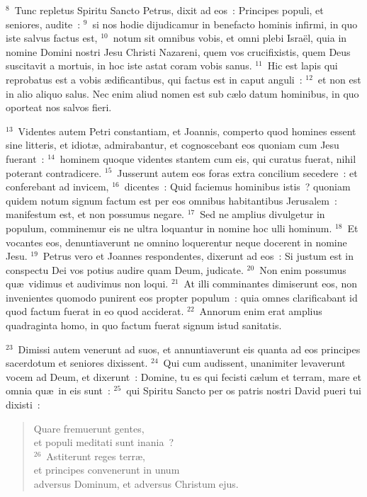${}^{8}$~Tunc repletus Spiritu Sancto Petrus, dixit ad eos~: Principes populi, et seniores, audite~:
${}^{9}$~si nos hodie dijudicamur in benefacto hominis infirmi, in quo iste salvus factus est,
${}^{10}$~notum sit omnibus vobis, et omni plebi Isra\"el, quia in nomine Domini nostri Jesu Christi Nazareni, quem vos crucifixistis, quem Deus suscitavit a mortuis, in hoc iste astat coram vobis sanus.
${}^{11}$~Hic est lapis qui reprobatus est a vobis \ae dificantibus, qui factus est in caput anguli~:
${}^{12}$~et non est in alio aliquo salus. Nec enim aliud nomen est sub c\ae lo datum hominibus, in quo oporteat nos salvos fieri.


${}^{13}$~Videntes autem Petri constantiam, et Joannis, comperto quod homines essent sine litteris, et idiot\ae , admirabantur, et cognoscebant eos quoniam cum Jesu fuerant~:
${}^{14}$~hominem quoque videntes stantem cum eis, qui curatus fuerat, nihil poterant contradicere.
${}^{15}$~Jusserunt autem eos foras extra concilium secedere~: et conferebant ad invicem,
${}^{16}$~dicentes~: Quid faciemus hominibus istis~? quoniam quidem notum signum factum est per eos omnibus habitantibus Jerusalem~: manifestum est, et non possumus negare.
${}^{17}$~Sed ne amplius divulgetur in populum, comminemur eis ne ultra loquantur in nomine hoc ulli hominum.
${}^{18}$~Et vocantes eos, denuntiaverunt ne omnino loquerentur neque docerent in nomine Jesu.
${}^{19}$~Petrus vero et Joannes respondentes, dixerunt ad eos~: Si justum est in conspectu Dei vos potius audire quam Deum, judicate.
${}^{20}$~Non enim possumus qu\ae\ vidimus et audivimus non loqui.
${}^{21}$~At illi comminantes dimiserunt eos, non invenientes quomodo punirent eos propter populum~: quia omnes clarificabant id quod factum fuerat in eo quod acciderat.
${}^{22}$~Annorum enim erat amplius quadraginta homo, in quo factum fuerat signum istud sanitatis.


${}^{23}$~Dimissi autem venerunt ad suos, et annuntiaverunt eis quanta ad eos principes sacerdotum et seniores dixissent.
${}^{24}$~Qui cum audissent, unanimiter levaverunt vocem ad Deum, et dixerunt~: Domine, tu es qui fecisti c\ae lum et terram, mare et omnia qu\ae\ in eis sunt~:
${}^{25}$~qui Spiritu Sancto per os patris nostri David pueri tui dixisti~: \begin{flushleft}\begin{verse}Quare fremuerunt gentes,\\ et populi meditati sunt inania~?\\
${}^{26}$~Astiterunt reges terr\ae ,\\ et principes convenerunt in unum\\ adversus Dominum, et adversus Christum ejus.\end{verse}\end{flushleft}



